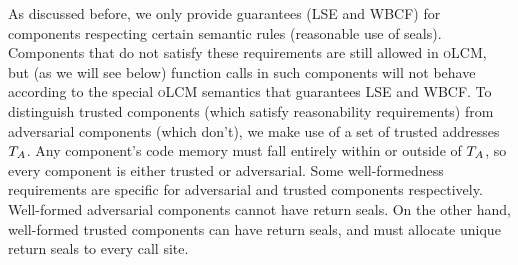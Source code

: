 \documentclass{jfp}
\renewcommand{\comp}{\var{comp}}
\newcommand{\wdjud}[2][ ]{#1 \vdash #2}
\newcommand{\srccm}{\textsc{oLCM}}
\newenvironment{jversion}{}{}
\begin{document}
\begin{jversion}
  As discussed before, we only provide guarantees (LSE and WBCF) for components respecting certain semantic rules (reasonable use of seals).
  Components that do not satisfy these requirements are still allowed in \srccm{}, but (as we will see below) function calls in such components will not behave according to the special \srccm{} semantics that guarantees LSE and WBCF.
  To distinguish trusted components (which satisfy reasonability requirements) from adversarial components (which don't), we make use of a set of trusted addresses $T_{A}$.
  Any component's code memory must fall entirely within or outside of $T_{A}$, so every component is either trusted or adversarial.
  Some well-formedness requirements are specific for adversarial and trusted components respectively.
  Well-formed adversarial components cannot have return seals.
  On the other hand, well-formed trusted components can have return seals, and must allocate unique return seals to every call site.
\end{jversion}

\end{document}
